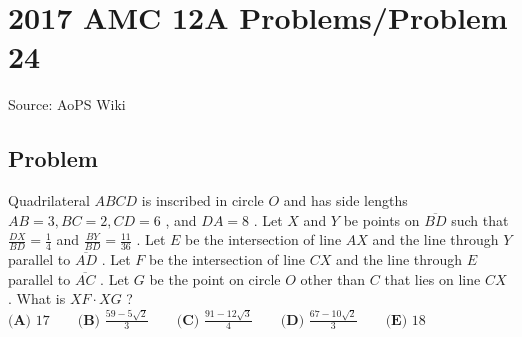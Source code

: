 \documentclass[12pt]{article}
\begin{document}
\section*{{2017 AMC 12A Problems/Problem 24}}
Source: AoPS Wiki

\subsection*{Problem}
Quadrilateral $ABCD$ is inscribed in circle $O$ and has side lengths $AB=3, BC=2, CD=6$ , and $DA=8$ . Let $X$ and $Y$ be points on $\overline{BD}$ such that $\frac{DX}{BD} = \frac{1}{4}$ and $\frac{BY}{BD} = \frac{11}{36}$ .
Let $E$ be the intersection of line $AX$ and the line through $Y$ parallel to $\overline{AD}$ . Let $F$ be the intersection of line $CX$ and the line through $E$ parallel to $\overline{AC}$ . Let $G$ be the point on circle $O$ other than $C$ that lies on line $CX$ . What is $XF\cdot XG$ ? $\textbf{(A) }17\qquad\textbf{(B) }\frac{59 - 5\sqrt{2}}{3}\qquad\textbf{(C) }\frac{91 - 12\sqrt{3}}{4}\qquad\textbf{(D) }\frac{67 - 10\sqrt{2}}{3}\qquad\textbf{(E) }18$
\end{document}
